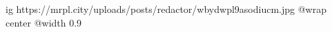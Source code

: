  
 
 
 
 

\ifcmt
  ig https://mrpl.city/uploads/posts/redactor/wbydwpl9asodiucm.jpg
  @wrap center
  @width 0.9
\fi
